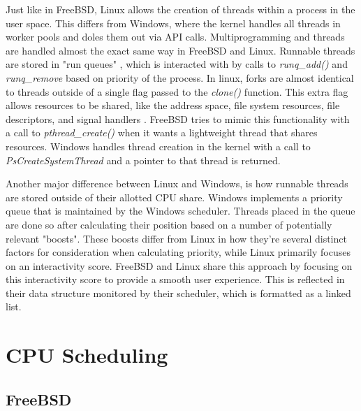 \documentclass[10pt,draftclsnofoot,onecolumn]{IEEEtran}
\begin{document}
\par Just like in FreeBSD, Linux allows the creation of threads within a process in the user space.
This differs from Windows, where the kernel handles all threads in worker pools and doles them out via API calls.
Multiprogramming and threads are handled almost the exact same way in FreeBSD and Linux.
Runnable threads are stored in "run queues" \cite{bsd:1} \cite{linux:1}, which is interacted with by calls to \textit{runq\_add()} and \textit{runq\_remove} based on priority of the process.
In linux, forks are almost identical to threads outside of a single flag passed to the \textit{clone()} function.
This extra flag allows resources to be shared, like the address space, file system resources, file descriptors, and signal handlers \cite{linux:1}.
FreeBSD tries to mimic this functionality with a call to \textit{pthread\_create()} when it wants a lightweight thread that shares resources.
Windows handles thread creation in the kernel with a call to \textit{PsCreateSystemThread} and a pointer to that thread is returned.

\par Another major difference between Linux and Windows, is how runnable threads are stored outside of their allotted CPU share.
Windows implements a priority queue that is maintained by the Windows scheduler.
Threads placed in the queue are done so after calculating their position based on a number of potentially relevant "boosts".
These boosts differ from Linux in how they're several distinct factors for consideration when calculating priority, while Linux primarily focuses on an interactivity score.
FreeBSD and Linux share this approach by focusing on this interactivity score to provide a smooth user experience.
This is reflected in their data structure monitored by their scheduler, which is formatted as a linked list.

\section{CPU Scheduling}
\label{sec:CPU Scheduling}

\subsection{FreeBSD}
\label{sub:CPU Scheduling FreeBSD}
\end{document}

